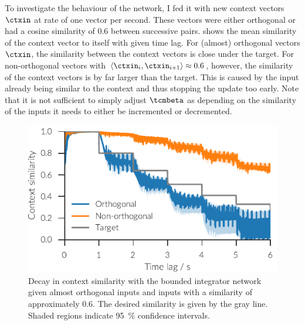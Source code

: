 To investigate the behaviour of the network, I fed it with new context vectors $\ctxin$ at rate of one vector per second.
These vectors were either orthogonal or had a cosine similarity of \num{0.6} between successive pairs.
 shows the mean similarity of the context vector to itself with given time lag.
For (almost) orthogonal vectors $\ctxin$, the similarity between the context vectors is close under the target.
For non-orthogonal vectors with $\langle\ctxin_i, \ctxin_{i+1}\rangle \approx 0.6$, however, the similarity of the context vectors is by far larger than the target.
This is caused by the input already being similar to the context and thus stopping the update too early.
Note that it is not sufficient to simply adjust $\tcmbeta$ as depending on the similarity of the inputs it needs to either be incremented or decremented.
\begin{figure}
    \centering
    \includegraphics{figures/context-analysis/bounded-integrator}
    \caption[Decay in context similarity with the bounded integrator network]{
        Decay in context similarity with the bounded integrator network given almost orthogonal inputs and inputs with a similarity of approximately \num{0.6}.
        The desired similarity is given by the gray line. Shaded regions indicate \SI{95}{\percent} confidence intervals.}\label{fig:bounded-integrator}
\end{figure}

